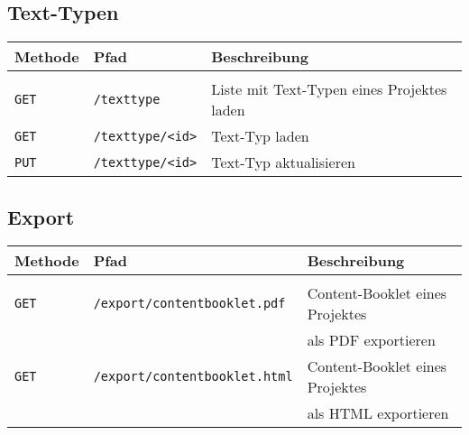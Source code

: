 \subsection{Text-Typen}

\begin{tabular}{@{}l l l}
\textbf{Methode} & \textbf{Pfad} & \textbf{Beschreibung}\\
\hline\\[-1.5ex]
\texttt{GET} & \texttt{/texttype} & Liste mit Text-Typen eines Projektes laden\\
\texttt{GET} & \texttt{/texttype/<id>} & Text-Typ laden\\
\texttt{PUT} & \texttt{/texttype/<id>} & Text-Typ aktualisieren\\
\end{tabular}

\subsection{Export}

\begin{tabular}{@{}l l l}
\textbf{Methode} & \textbf{Pfad} & \textbf{Beschreibung}\\
\hline\\[-1.5ex]
\texttt{GET} & \texttt{/export/contentbooklet.pdf} & Content-Booklet eines Projektes\\
&&als PDF exportieren\\
\texttt{GET} & \texttt{/export/contentbooklet.html} & Content-Booklet eines Projektes\\
&&als HTML exportieren\\
\end{tabular}

\pagebreak